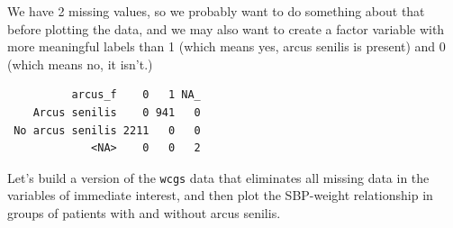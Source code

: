 \documentclass[
]{book}
\newenvironment{Shaded}{\begin{snugshade}}{\end{snugshade}}
\newcommand{\DataTypeTok}[1]{\textcolor[rgb]{0.13,0.29,0.53}{#1}}
\newcommand{\KeywordTok}[1]{\textcolor[rgb]{0.13,0.29,0.53}{\textbf{#1}}}
\newcommand{\NormalTok}[1]{#1}
\newcommand{\OperatorTok}[1]{\textcolor[rgb]{0.81,0.36,0.00}{\textbf{#1}}}
\newcommand{\StringTok}[1]{\textcolor[rgb]{0.31,0.60,0.02}{#1}}
\begin{document}
We have 2 missing values, so we probably want to do something about that before plotting the data, and we may also want to create a factor variable with more meaningful labels than 1 (which means yes, arcus senilis is present) and 0 (which means no, it isn't.)

\begin{Shaded}
\end{Shaded}

\begin{verbatim}
          arcus_f    0   1 NA_
    Arcus senilis    0 941   0
 No arcus senilis 2211   0   0
             <NA>    0   0   2
\end{verbatim}

Let's build a version of the \texttt{wcgs} data that eliminates all missing data in the variables of immediate interest, and then plot the SBP-weight relationship in groups of patients with and without arcus senilis.
\end{document}
